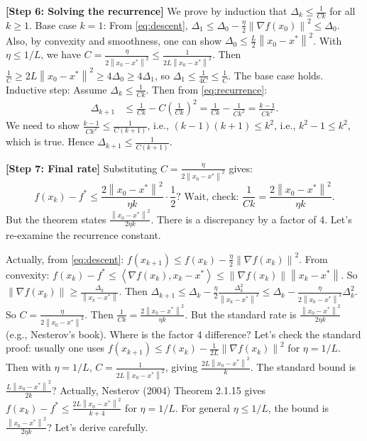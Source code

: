\documentclass{article}
\newcommand{\norm}[1]{\left\| #1 \right\|}
\newcommand{\inner}[1]{\left\langle #1 \right\rangle}
\newcommand{\step}[1]{\noindent\textbf{[Step #1]}}
\begin{document}
\step{6: Solving the recurrence}
We prove by induction that $\Delta_k \le \frac{1}{C k}$ for all $k \ge 1$.
Base case $k=1$: From \eqref{eq:descent}, $\Delta_1 \le \Delta_0 - \frac{\eta}{2}\norm{\nabla f(x_0)}^2 \le \Delta_0$. Also, by convexity and smoothness, one can show $\Delta_0 \le \frac{L}{2}\norm{x_0 - x^*}^2$. With $\eta \le 1/L$, we have $C = \frac{\eta}{2\norm{x_0 - x^*}^2} \le \frac{1}{2L\norm{x_0 - x^*}^2}$. Then $\frac{1}{C} \ge 2L\norm{x_0 - x^*}^2 \ge 4\Delta_0 \ge 4\Delta_1$, so $\Delta_1 \le \frac{1}{4C} \le \frac{1}{C}$. The base case holds.
Inductive step: Assume $\Delta_k \le \frac{1}{C k}$. Then from \eqref{eq:recurrence}:
\begin{align}
    \Delta_{k+1} &\le \frac{1}{C k} - C \left(\frac{1}{C k}\right)^2 = \frac{1}{C k} - \frac{1}{C k^2} = \frac{k-1}{C k^2}.
\end{align}
We need to show $\frac{k-1}{C k^2} \le \frac{1}{C(k+1)}$, i.e., $(k-1)(k+1) \le k^2$, i.e., $k^2 - 1 \le k^2$, which is true. Hence $\Delta_{k+1} \le \frac{1}{C(k+1)}$.

\step{7: Final rate}
Substituting $C = \frac{\eta}{2\norm{x_0 - x^*}^2}$ gives:
\begin{equation}
    f(x_k) - f^* \le \frac{2\norm{x_0 - x^*}^2}{\eta k} \cdot \frac{1}{2}? \text{ Wait, check: } \frac{1}{C k} = \frac{2\norm{x_0 - x^*}^2}{\eta k}.
\end{equation}
But the theorem states $\frac{\norm{x_0 - x^*}^2}{2\eta k}$. There is a discrepancy by a factor of 4. Let's re-examine the recurrence constant.

Actually, from \eqref{eq:descent}: $f(x_{k+1}) \le f(x_k) - \frac{\eta}{2} \norm{\nabla f(x_k)}^2$.
From convexity: $f(x_k) - f^* \le \inner{\nabla f(x_k), x_k - x^*} \le \norm{\nabla f(x_k)} \norm{x_k - x^*}$.
So $\norm{\nabla f(x_k)} \ge \frac{\Delta_k}{\norm{x_k - x^*}}$.
Then $\Delta_{k+1} \le \Delta_k - \frac{\eta}{2} \frac{\Delta_k^2}{\norm{x_k - x^*}^2} \le \Delta_k - \frac{\eta}{2\norm{x_0 - x^*}^2} \Delta_k^2$.
So $C = \frac{\eta}{2\norm{x_0 - x^*}^2}$.
Then $\frac{1}{C k} = \frac{2\norm{x_0 - x^*}^2}{\eta k}$.
But the standard rate is $\frac{\norm{x_0 - x^*}^2}{2\eta k}$ (e.g., Nesterov's book). Where is the factor 4 difference?
Let's check the standard proof: usually one uses $f(x_{k+1}) \le f(x_k) - \frac{1}{2L} \norm{\nabla f(x_k)}^2$ for $\eta = 1/L$. Then with $\eta=1/L$, $C = \frac{1}{2L\norm{x_0 - x^*}^2}$, giving $\frac{2L\norm{x_0 - x^*}^2}{k}$. The standard bound is $\frac{L\norm{x_0 - x^*}^2}{2k}$? Actually, Nesterov (2004) Theorem 2.1.15 gives $f(x_k) - f^* \le \frac{2L\norm{x_0 - x^*}^2}{k+4}$ for $\eta=1/L$. For general $\eta \le 1/L$, the bound is $\frac{\norm{x_0 - x^*}^2}{2\eta k}$? Let's derive carefully.
\end{document}
